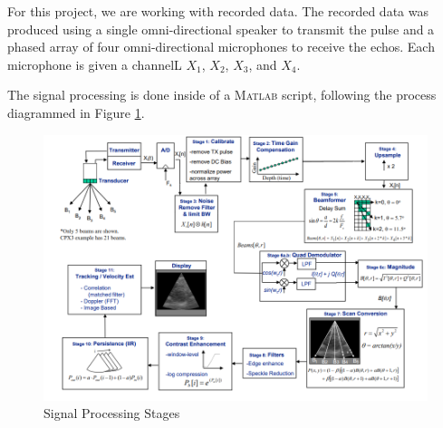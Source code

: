 For this project, we are working with recorded data.  The recorded data was produced using a single omni-directional speaker to transmit the pulse and a phased array of four omni-directional microphones to receive the echos.  Each microphone is given a channelL $X_1$, $X_2$, $X_3$, and $X_4$.

The signal processing is done inside of a \textsc{Matlab} script, following the process diagrammed in Figure \ref{fig:stages}. 

\begin{figure}[H]
    \centering
    \includegraphics[width=0.75\linewidth]{figures/stages.png}
    \caption{Signal Processing Stages}
    \label{fig:stages}
\end{figure}
